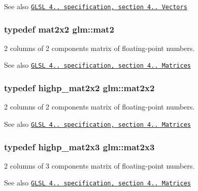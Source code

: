 \begin{DoxySeeAlso}{See also}
\href{http://www.opengl.org/registry/doc/GLSLangSpec.4.20.8.pdf}{\tt G\+L\+SL 4.. specification, section 4.. Vectors} 
\end{DoxySeeAlso}
\subsubsection[{\texorpdfstring{mat2}{mat2}}]{\setlength{\rightskip}{0pt plus 5cm}typedef mat2x2 {\bf glm\+::mat2}}\hypertarget{group__core__types_ga8357ec0aab6f8cf69313592492663c3f}{}\label{group__core__types_ga8357ec0aab6f8cf69313592492663c3f}
2 columns of 2 components matrix of floating-\/point numbers.

\begin{DoxySeeAlso}{See also}
\href{http://www.opengl.org/registry/doc/GLSLangSpec.4.20.8.pdf}{\tt G\+L\+SL 4.. specification, section 4.. Matrices} 
\end{DoxySeeAlso}
\subsubsection[{\texorpdfstring{mat2x2}{mat2x2}}]{\setlength{\rightskip}{0pt plus 5cm}typedef highp\+\_\+mat2x2 {\bf glm\+::mat2x2}}\hypertarget{group__core__types_gaeddc14adb4963d9bad73866cc202fb40}{}\label{group__core__types_gaeddc14adb4963d9bad73866cc202fb40}
2 columns of 2 components matrix of floating-\/point numbers.

\begin{DoxySeeAlso}{See also}
\href{http://www.opengl.org/registry/doc/GLSLangSpec.4.20.8.pdf}{\tt G\+L\+SL 4.. specification, section 4.. Matrices} 
\end{DoxySeeAlso}
\subsubsection[{\texorpdfstring{mat2x3}{mat2x3}}]{\setlength{\rightskip}{0pt plus 5cm}typedef highp\+\_\+mat2x3 {\bf glm\+::mat2x3}}\hypertarget{group__core__types_gaea02797b8231f6dd9380345f6ff12155}{}\label{group__core__types_gaea02797b8231f6dd9380345f6ff12155}
2 columns of 3 components matrix of floating-\/point numbers.

\begin{DoxySeeAlso}{See also}
\href{http://www.opengl.org/registry/doc/GLSLangSpec.4.20.8.pdf}{\tt G\+L\+SL 4.. specification, section 4.. Matrices} 
\end{DoxySeeAlso}
